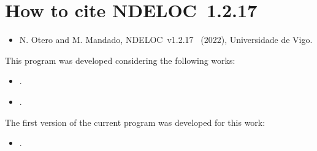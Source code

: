 \documentclass[a4paper,11pt,openany]{memoir}
\newcommand\versionprog{1.2.17}
\newcommand\programa{\textsc{NDELOC}}
\begin{document}
\section{How to cite \textsc{\programa~\versionprog}}
\begin{itemize}
	\item N. Otero and M. Mandado, \programa~v\versionprog~ (2022), Universidade de Vigo.
\end{itemize}
This program was developed considering the following works:
\begin{itemize}
	\item{}.
	\item{}.
\end{itemize}
The first version of the current program was developed for this work:
\begin{itemize}
	\item{}.
\end{itemize}
\end{document}
